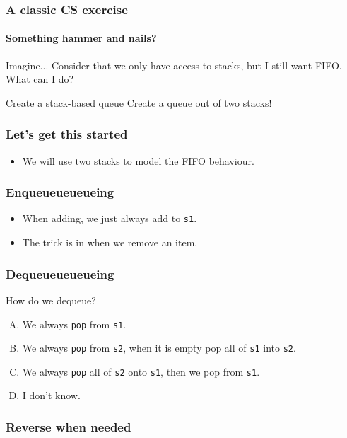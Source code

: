 \begin{frame}
\frametitle{A classic CS exercise}
\framesubtitle{Something hammer and nails?}	

\begin{problemblock}{Imagine...}
	Consider that we only have access to stacks, but I still want FIFO.\\
	What can I do?
\end{problemblock}
\pause
\begin{answerblock}{Create a stack-based queue}
	Create a queue out of two stacks!
\end{answerblock}
\end{frame}

\begin{frame}
	\frametitle{Let's get this started}
	
	
	\begin{itemize}
		\item We will use two stacks to model the FIFO behaviour.
	\end{itemize}
\end{frame}

\begin{frame}
	\frametitle{Enqueueueueueing}
	
	\begin{itemize}
		\item When adding, we just always add to \texttt{s1}.
			\pause
		\item The trick is in when we remove an item.
	\end{itemize}
\end{frame}

\begin{frame}
	\frametitle{Dequeueueueueing}
	\begin{questionblock}{How do we dequeue?}
		\begin{enumerate}[A.]
			\item We always \texttt{pop} from \texttt{s1}.
			\item We always \texttt{pop} from \texttt{s2}, when it is empty pop all of \texttt{s1} into \texttt{s2}.
			\item We always \texttt{pop} all of \texttt{s2} onto \texttt{s1}, then we pop from \texttt{s1}.
			\item I don't know.
		\end{enumerate}
	\end{questionblock}
\end{frame}

\begin{frame}
	\frametitle{Reverse when needed}
	
\end{frame}
